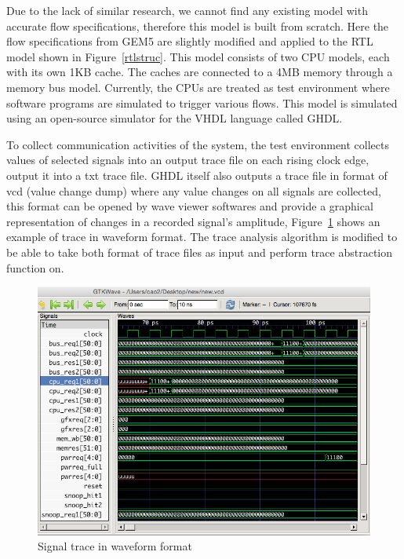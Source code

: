 \documentclass[12pt,frontmatter,copyright,thesis]{usfmanus}
\begin{document}
 Due to the lack of similar research, we cannot find any existing model with accurate flow specifications,
therefore this model is built from scratch.
Here the flow specifications from GEM5 are slightly modified and applied
to the RTL model shown in Figure~\ref{rtlstruc}.
 This model consists of two CPU models, each with its own 1KB cache.
 The caches are connected to a 4MB memory through a memory bus model.
 Currently, the CPUs are treated as test environment where software programs are simulated to trigger various flows.
 This model is simulated using an open-source simulator for the VHDL language called GHDL.


 To collect communication activities of the system,
 the test environment collects values of selected signals
 into an output trace file on each rising clock edge, output it
 into a txt trace file.
GHDL itself also
outputs a trace file in format of vcd (value change dump) where
any value changes on all signals are collected, this format
can be opened by wave viewer softwares and provide a 
graphical representation of changes in a recorded signal's amplitude,
Figure~\ref{wave} shows an example of trace in waveform format.
The trace analysis algorithm is modified to be able
to take both format of trace files as input and
perform trace abstraction function on.
 \begin{figure} [h]
\centerline{
\includegraphics[width=5in]{wave.png}}
\caption{Signal trace in waveform format}
\label{wave}
\end{figure}
\end{document}
